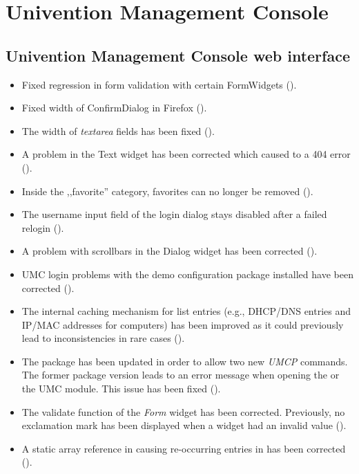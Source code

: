 \section{Univention Management Console}

\subsection{Univention Management Console web interface}
\begin{itemize}
\item Fixed regression in form validation with certain FormWidgets
  ().
\item Fixed width of ConfirmDialog in Firefox ().
\item The width of \emph{textarea} fields has been fixed
  ().
\item A problem in the Text widget has been corrected which caused to
  a 404 error ().
\item Inside the ,,favorite'' category, favorites can no longer be
  removed ().
\item The username input field of the login dialog stays disabled
  after a failed relogin ().
\item A problem with scrollbars in the Dialog widget has been
  corrected ().
\item UMC login problems with the demo configuration package installed have
  been corrected ().
\item The internal caching mechanism for list entries (e.g., DHCP/DNS
  entries and IP/MAC addresses for computers) has been improved as it
  could previously lead to inconsistencies in rare cases ().
\item The  package has been
  updated in order to allow two new \emph{UMCP} commands. The former
  package version leads to an error message when opening the
   or the  UMC module. This
  issue has been fixed ().
\item The validate function of the \emph{Form} widget has been corrected.
  Previously, no exclamation mark has been displayed when a widget had an
  invalid value ().
\item A static array reference in  causing re-occurring
  entries in  has been corrected ().
\end{itemize}

